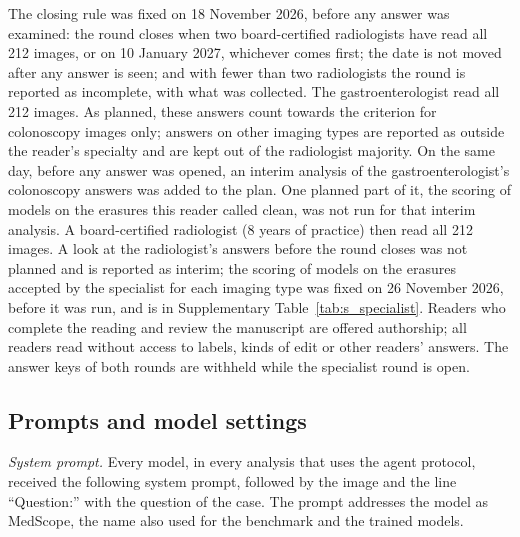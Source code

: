 The closing rule was fixed on 18 November 2026, before any answer was examined: the round closes when two board-certified radiologists have read all 212 images, or on 10 January 2027, whichever comes first; the date is not moved after any answer is seen; and with fewer than two radiologists the round is reported as incomplete, with what was collected. The gastroenterologist read all 212 images. As planned, these answers count towards the criterion for colonoscopy images only; answers on other imaging types are reported as outside the reader's specialty and are kept out of the radiologist majority. On the same day, before any answer was opened, an interim analysis of the gastroenterologist's colonoscopy answers was added to the plan. One planned part of it, the scoring of models on the erasures this reader called clean, was not run for that interim analysis. A board-certified radiologist (8 years of practice) then read all 212 images. A look at the radiologist's answers before the round closes was not planned and is reported as interim; the scoring of models on the erasures accepted by the specialist for each imaging type was fixed on 26 November 2026, before it was run, and is in Supplementary Table~\ref{tab:s_specialist}. Readers who complete the reading and review the manuscript are offered authorship; all readers read without access to labels, kinds of edit or other readers' answers. The answer keys of both rounds are withheld while the specialist round is open.

\subsection{Prompts and model settings}
\label{sec:s_prompts}

\emph{System prompt.} Every model, in every analysis that uses the agent protocol, received the following system prompt, followed by the image and the line ``Question:'' with the question of the case. The prompt addresses the model as MedScope, the name also used for the benchmark and the trained models.


